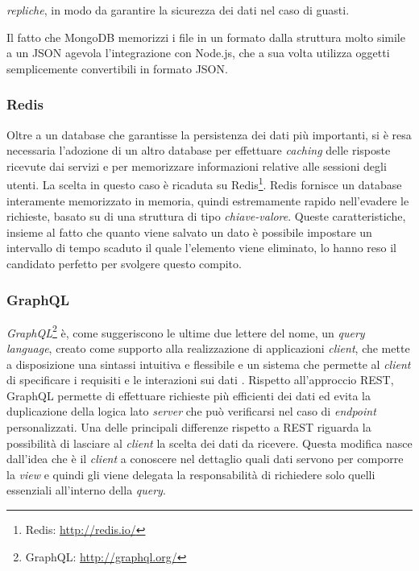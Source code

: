 \emph{repliche}, in modo da garantire la sicurezza dei dati nel caso di guasti.

Il fatto che MongoDB memorizzi i file in un formato dalla struttura molto simile a un JSON agevola l'integrazione con Node.js, che a sua volta utilizza oggetti semplicemente convertibili in formato JSON.

\subsubsection{Redis}

Oltre a un database che garantisse la persistenza dei dati più importanti, si è resa necessaria l'adozione di un altro database per effettuare  \emph{caching} delle risposte ricevute dai servizi e per memorizzare informazioni relative alle sessioni degli utenti. La scelta in questo caso è ricaduta su Redis\footnote{Redis: \url{http://redis.io/}}. Redis fornisce un database interamente memorizzato in memoria, quindi estremamente rapido nell'evadere le richieste, basato su di una struttura di tipo \emph{chiave-valore}. Queste caratteristiche, insieme al fatto che quanto viene salvato un dato è possibile impostare un intervallo di tempo scaduto il quale l'elemento viene eliminato, lo hanno reso il candidato perfetto per svolgere questo compito.

\subsubsection{GraphQL\label{sec:graphql-introduzione}}

\emph{GraphQL}\footnote{GraphQL: \url{http://graphql.org/}} è, come suggeriscono le ultime due lettere del nome, un \emph{query language}, creato come supporto alla realizzazione di applicazioni \emph{client}, che mette a disposizione una sintassi intuitiva e flessibile e un sistema che permette al \emph{client} di specificare i requisiti e le interazioni sui dati \cite{website:graphql-specs}. Rispetto all'approccio REST, GraphQL permette di effettuare richieste più efficienti dei dati ed evita la duplicazione della logica lato \emph{server} che può verificarsi nel caso di \emph{endpoint} personalizzati. Una delle principali differenze rispetto a REST riguarda la possibilità di lasciare al \emph{client} la scelta dei dati da ricevere. Questa modifica nasce dall'idea che è il \emph{client} a conoscere nel dettaglio quali dati servono per comporre la \emph{view} e quindi gli viene delegata la responsabilità di richiedere solo quelli essenziali all'interno della \emph{query}.

